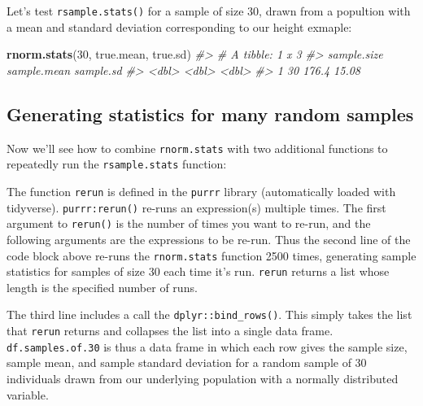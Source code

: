 \documentclass[]{book}
\newenvironment{Shaded}{\begin{snugshade}}{\end{snugshade}}
\newcommand{\CommentTok}[1]{\textcolor[rgb]{0.56,0.35,0.01}{\textit{#1}}}
\newcommand{\DecValTok}[1]{\textcolor[rgb]{0.00,0.00,0.81}{#1}}
\newcommand{\FloatTok}[1]{\textcolor[rgb]{0.00,0.00,0.81}{#1}}
\newcommand{\KeywordTok}[1]{\textcolor[rgb]{0.13,0.29,0.53}{\textbf{#1}}}
\newcommand{\NormalTok}[1]{#1}
\newcommand{\OperatorTok}[1]{\textcolor[rgb]{0.81,0.36,0.00}{\textbf{#1}}}
\newcommand{\StringTok}[1]{\textcolor[rgb]{0.31,0.60,0.02}{#1}}
\theoremstyle{definition}
\theoremstyle{definition}
\theoremstyle{definition}
\theoremstyle{remark}
\begin{document}
Let's test \texttt{rsample.stats()} for a sample of size 30, drawn from
a popultion with a mean and standard deviation corresponding to our
height exmaple:

\begin{Shaded}
\begin{Highlighting}[]
\KeywordTok{rnorm.stats}\NormalTok{(}\DecValTok{30}\NormalTok{, true.mean, true.sd)}
\CommentTok{#> # A tibble: 1 x 3}
\CommentTok{#>   sample.size sample.mean sample.sd}
\CommentTok{#>         <dbl>       <dbl>     <dbl>}
\CommentTok{#> 1          30       176.4     15.08}
\end{Highlighting}
\end{Shaded}

\hypertarget{generating-statistics-for-many-random-samples}{%
\subsection{Generating statistics for many random
samples}\label{generating-statistics-for-many-random-samples}}

Now we'll see how to combine \texttt{rnorm.stats} with two additional
functions to repeatedly run the \texttt{rsample.stats} function:

\begin{Shaded}
\end{Shaded}

The function \texttt{rerun} is defined in the \texttt{purrr} library
(automatically loaded with tidyverse). \texttt{purrr:rerun()} re-runs an
expression(s) multiple times. The first argument to \texttt{rerun()} is
the number of times you want to re-run, and the following arguments are
the expressions to be re-run. Thus the second line of the code block
above re-runs the \texttt{rnorm.stats} function 2500 times, generating
sample statistics for samples of size 30 each time it's run.
\texttt{rerun} returns a list whose length is the specified number of
runs.

The third line includes a call the \texttt{dplyr::bind\_rows()}. This
simply takes the list that \texttt{rerun} returns and collapses the list
into a single data frame. \texttt{df.samples.of.30} is thus a data frame
in which each row gives the sample size, sample mean, and sample
standard deviation for a random sample of 30 individuals drawn from our
underlying population with a normally distributed variable.
\end{document}
